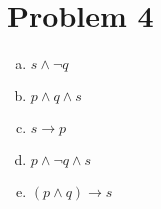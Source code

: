 \section*{Problem 4}


\begin{sol}
    \begin{enumerate}[(a)]
        \item $s\land\lnot q$
        \item $p\land q\land s$
        \item $s\to p$
        \item $p\land\lnot q\land s$
        \item $(p\land q)\to s$
    \end{enumerate}
\end{sol}

